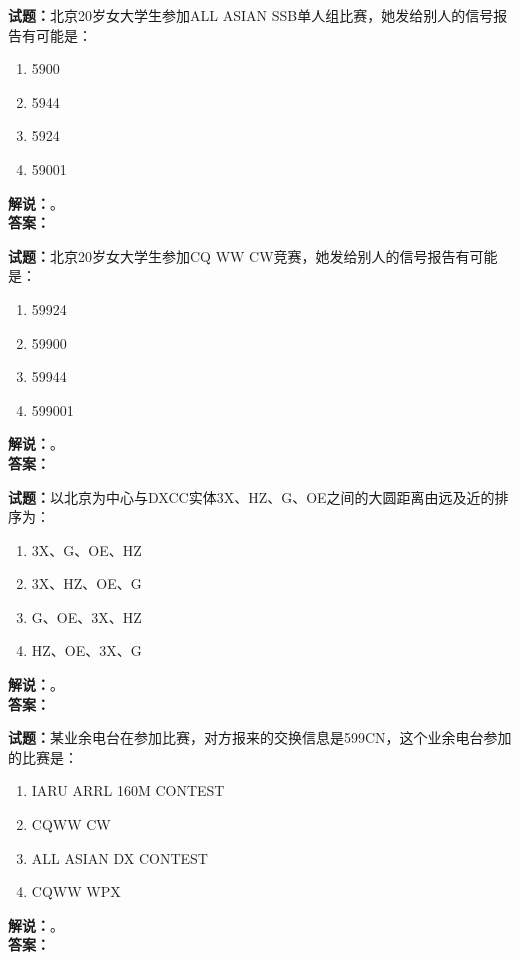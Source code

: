 \documentclass{ctexbook}
\begin{document}
\bigskip




\noindent\textbf{试题：}北京20岁女大学生参加ALL ASIAN SSB单人组比赛，她发给别人的信号报告有可能是：
\begin{enumerate}[leftmargin=3em]
\item 5900
\item 5944
\item 5924
\item 59001
\end{enumerate}
\noindent\textbf{解说：}\textbf{}。\\\noindent\textbf{答案：}

\bigskip




\noindent\textbf{试题：}北京20岁女大学生参加CQ WW CW竞赛，她发给别人的信号报告有可能是：
\begin{enumerate}[leftmargin=3em]
\item 59924
\item 59900
\item 59944
\item 599001
\end{enumerate}
\noindent\textbf{解说：}\textbf{}。\\\noindent\textbf{答案：}

\bigskip




\noindent\textbf{试题：}以北京为中心与DXCC实体3X、HZ、G、OE之间的大圆距离由远及近的排序为：
\begin{enumerate}[leftmargin=3em]
\item 3X、G、OE、HZ
\item 3X、HZ、OE、G
\item G、OE、3X、HZ
\item HZ、OE、3X、G
\end{enumerate}
\noindent\textbf{解说：}\textbf{}。\\\noindent\textbf{答案：}

\bigskip




\noindent\textbf{试题：}某业余电台在参加比赛，对方报来的交换信息是599CN，这个业余电台参加的比赛是：
\begin{enumerate}[leftmargin=3em]
\item IARU ARRL 160M CONTEST
\item CQWW CW
\item ALL ASIAN DX CONTEST
\item CQWW WPX
\end{enumerate}
\noindent\textbf{解说：}\textbf{}。\\\noindent\textbf{答案：}
\end{document}

